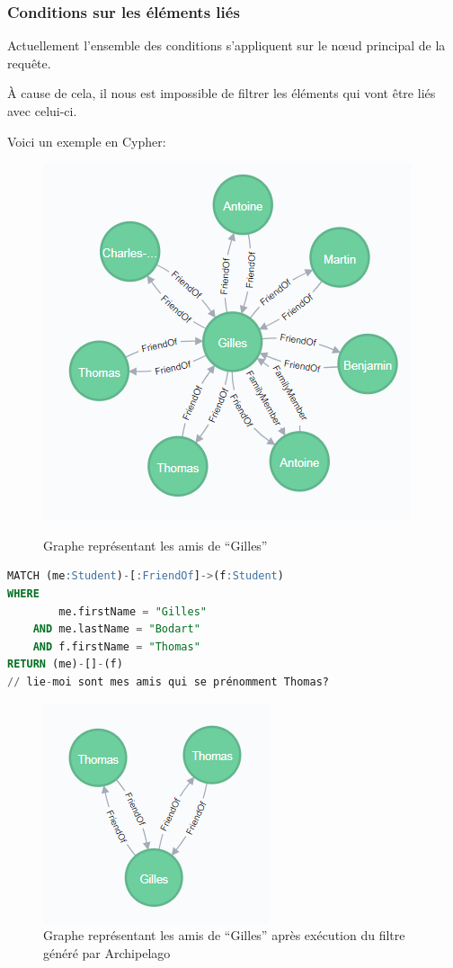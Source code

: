\documentclass[a4paper,fleqn,12pt,oneside]{report}
\begin{document}
\subsubsection*{\bf Conditions sur les éléments liés}

Actuellement l'ensemble des conditions s'appliquent sur le nœud principal de la requête.

\`A cause de cela, il nous est impossible de filtrer les éléments qui vont être liés avec celui-ci. 

Voici un exemple en Cypher:

\begin{figure}[!ht]
\centering
\includegraphics[scale=1]{figures/friendOf.png}
\label{fig:friendOf}
\caption{Graphe représentant les amis de \enquote{Gilles}}
\end{figure}
 
\begin{lstlisting}[language=SQL]
MATCH (me:Student)-[:FriendOf]->(f:Student)
WHERE
	    me.firstName = "Gilles"
	AND me.lastName = "Bodart"
	AND	f.firstName = "Thomas" 
RETURN (me)-[]-(f)
// lie-moi sont mes amis qui se prénomment Thomas?
\end{lstlisting} 

\begin{figure}[!ht]
\centering
\includegraphics[scale=1]{figures/friendOfFilt.png}
\caption{Graphe représentant les amis de \enquote{Gilles} après exécution du filtre généré par Archipelago}
\label{fig:friendOfFilt}
\end{figure}
\end{document}
